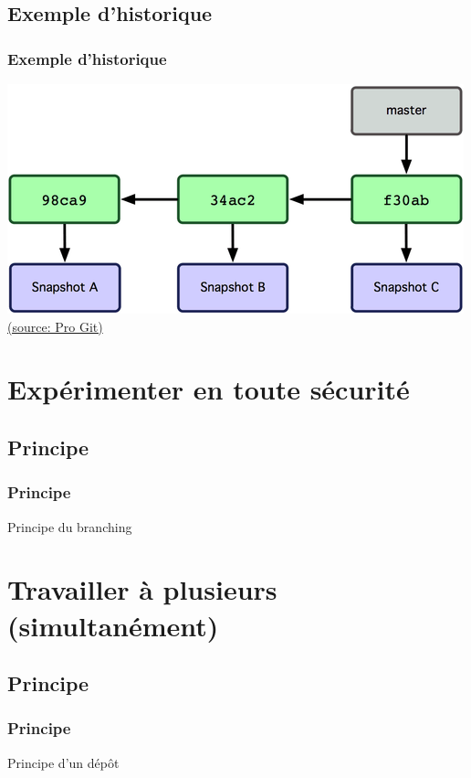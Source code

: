 \documentclass[t,11pt]{beamer}
\begin{document}
\subsection{Exemple d'historique}
\begin{frame}[c]
        \frametitle{Exemple d'historique}
        \includegraphics[width=\linewidth]{./img/master_branch}
        \newline
        \hspace*{15pt}
        \href{https://git-scm.com/book/fr/v1/Les-branches-avec-Git-Ce-qu-est-une-branche}{{\tiny (source: Pro Git)}}
\end{frame}
\section{Exp\'erimenter en toute s\'ecurit\'e}

\subsection{Principe}
\begin{frame}
        \frametitle{Principe}
        Principe du branching
\end{frame}

\section{Travailler \`a plusieurs (simultan\'ement) }

\subsection{Principe}
\begin{frame}
        \frametitle{Principe}
        Principe d'un d\'ep\^ot
\end{frame}
\end{document}

